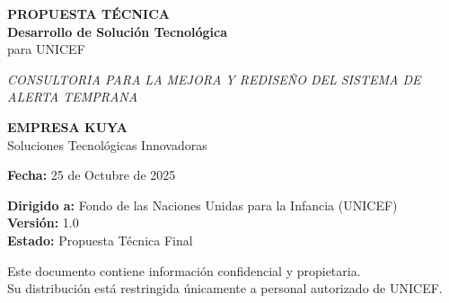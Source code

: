 \begin{titlepage}
    \centering
    
    
    \vspace{2cm}
    
    {\Huge\bfseries PROPUESTA TÉCNICA\\[0.5cm]}
    {\Large\bfseries Desarrollo de Solución Tecnológica\\[0.3cm]}
    {\Large para UNICEF\\[2cm]}
    
    {\large\textit{CONSULTORIA PARA LA MEJORA Y REDISEÑO DEL SISTEMA DE ALERTA TEMPRANA}\\[3cm]}
    
    {\Large\bfseries EMPRESA KUYA\\[0.5cm]}
    {\large Soluciones Tecnológicas Innovadoras\\[2cm]}
    
    {\large\textbf{Fecha:} 25 de Octubre de 2025\\[1cm]}
    
    {\normalsize
    \textbf{Dirigido a:} Fondo de las Naciones Unidas para la Infancia (UNICEF)\\[0.3cm]
    \textbf{Versión:} 1.0\\[0.3cm]
    \textbf{Estado:} Propuesta Técnica Final\\
    }
    
    \vfill
    
    {\footnotesize
    Este documento contiene información confidencial y propietaria.\\
    Su distribución está restringida únicamente a personal autorizado de UNICEF.
    }
    
\end{titlepage}

\newpage
\thispagestyle{empty}
\mbox{}
\newpage